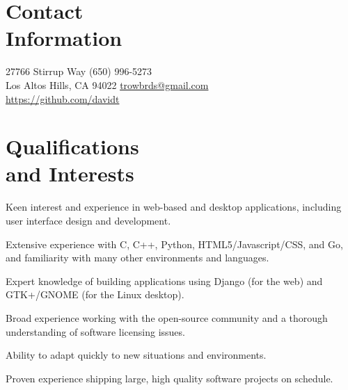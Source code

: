 \documentclass[margin,line]{resume}
\begin{document}
\begin{resume}


    \section{\mysidestyle Contact\\Information}

    27766 Stirrup Way \hfill (650) 996-5273\\
    Los Altos Hills, CA 94022 \hfill \href{mailto:trowbrds@gmail.com}{trowbrds@gmail.com}\\
    \hspace*{0pt} \hfill \href{https://github.com/davidt}{https://github.com/davidt}


    \section{\mysidestyle Qualifications\\and Interests}

    \begin{list2}
        \item Keen interest and experience in web-based and desktop
              applications, including user interface design and development.
        \item Extensive experience with C, C++, Python, HTML5/Javascript/CSS,
              and Go, and familiarity with many other environments and
              languages.
        \item Expert knowledge of building applications using Django (for the
              web) and GTK+/GNOME (for the Linux desktop).
        \item Broad experience working with the open-source community and a
              thorough understanding of software licensing issues.
        \item Ability to adapt quickly to new situations and environments.
        \item Proven experience shipping large, high quality software projects
              on schedule.
    \end{list2}



\end{resume}
\end{document}
